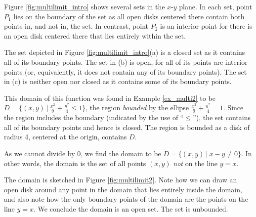 Figure \ref{fig:multilimit_intro} shows several sets in the $x$-$y$ plane. In each set, point $P_1$ lies on the boundary of the set as all open disks centered there contain both points in, and not in, the set. In contrast, point $P_2$ is an interior point for there is an open disk centered there that lies entirely within the set.

The set depicted in Figure \ref{fig:multilimit_intro}(a) is a closed set as it contains all of its boundary points. The set in (b) is open, for all of its points are interior points (or, equivalently, it does not contain any of its boundary points). The set in (c) is neither open nor closed as it contains  some of its boundary points.\\
\clearpage

{This domain of this function was found in Example \ref{ex_multi2} to be $D = \{(x,y)\ |\ \frac{x^2}9+\frac{y^2}4\leq 1\}$, the region \textit{bounded} by the ellipse $\frac{x^2}9+\frac{y^2}4=1$. Since the region includes the boundary (indicated by the use of ``$\leq$''), the set contains all of its boundary points and hence is closed. The region is bounded as a disk of radius 4, centered at the origin, contains $D$.
}\\

{As we cannot divide by 0, we find the domain to be $D = \{(x,y)\ |\ x-y\neq 0\}$. In other words, the domain is the set of all points $(x,y)$ \emph{not} on the line $y=x$. 

The domain is sketched in Figure \ref{fig:multilimit2}. Note how we can draw an open disk around any point in the domain that lies entirely inside the domain, and also note how the only boundary points of the domain are the points on the line $y=x$. We conclude the domain is an open set. The set is unbounded.
}\\

